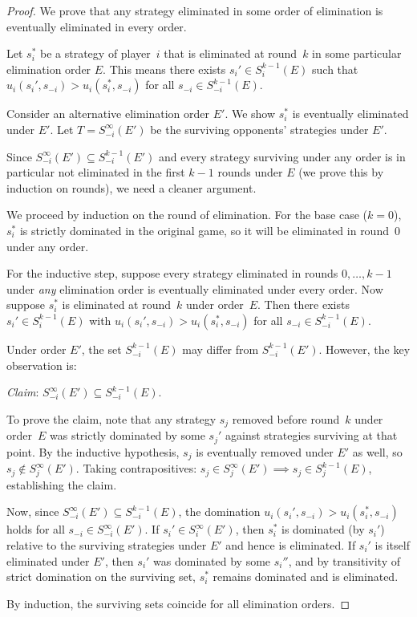 \documentclass[11pt,a4paper]{article}
\theoremstyle{definition}
\theoremstyle{plain}
\theoremstyle{remark}
\begin{document}
\begin{proof}
We prove that any strategy eliminated in some order of elimination is eventually
eliminated in every order.

Let $s_i^*$ be a strategy of player~$i$ that is eliminated at round~$k$ in some
particular elimination order $E$. This means there exists $s_i' \in S_i^{k-1}(E)$
such that $u_i(s_i', s_{-i}) > u_i(s_i^*, s_{-i})$ for all $s_{-i} \in S_{-i}^{k-1}(E)$.

Consider an alternative elimination order $E'$. We show $s_i^*$ is eventually
eliminated under $E'$. Let $T = S_{-i}^\infty(E')$ be the surviving opponents'
strategies under $E'$.

Since $S_{-i}^\infty(E') \subseteq S_{-i}^{k-1}(E')$ and every strategy surviving
under any order is in particular not eliminated in the first $k-1$ rounds under $E$
(we prove this by induction on rounds), we need a cleaner argument.

We proceed by induction on the round of elimination. For the base case ($k=0$),
$s_i^*$ is strictly dominated in the original game, so it will be eliminated in
round~0 under any order.

For the inductive step, suppose every strategy eliminated in rounds $0, \ldots, k-1$
under \emph{any} elimination order is eventually eliminated under every order. Now
suppose $s_i^*$ is eliminated at round~$k$ under order~$E$. Then there exists
$s_i' \in S_i^{k-1}(E)$ with $u_i(s_i', s_{-i}) > u_i(s_i^*, s_{-i})$ for all
$s_{-i} \in S_{-i}^{k-1}(E)$.

Under order $E'$, the set $S_{-i}^{k-1}(E)$ may differ from $S_{-i}^{k-1}(E')$.
However, the key observation is:

\emph{Claim}: $S_{-i}^\infty(E') \subseteq S_{-i}^{k-1}(E)$.

To prove the claim, note that any strategy $s_j$ removed before round~$k$ under
order~$E$ was strictly dominated by some $s_j'$ against strategies surviving at
that point. By the inductive hypothesis, $s_j$ is eventually removed under $E'$ as
well, so $s_j \notin S_j^\infty(E')$. Taking contrapositives:
$s_j \in S_j^\infty(E') \implies s_j \in S_j^{k-1}(E)$, establishing the claim.

Now, since $S_{-i}^\infty(E') \subseteq S_{-i}^{k-1}(E)$, the domination
$u_i(s_i', s_{-i}) > u_i(s_i^*, s_{-i})$ holds for all $s_{-i} \in S_{-i}^\infty(E')$.
If $s_i' \in S_i^\infty(E')$, then $s_i^*$ is dominated (by $s_i'$) relative to
the surviving strategies under $E'$ and hence is eliminated. If $s_i'$ is itself
eliminated under $E'$, then $s_i'$ was dominated by some $s_i''$, and by transitivity
of strict domination on the surviving set, $s_i^*$ remains dominated and is eliminated.

By induction, the surviving sets coincide for all elimination orders.
\end{proof}
\end{document}
